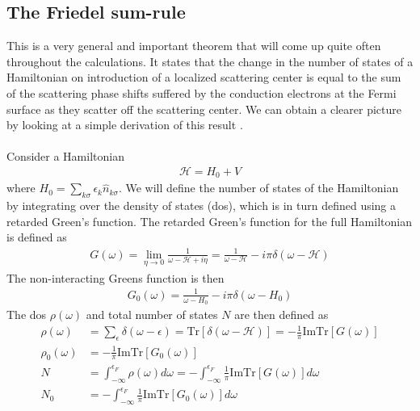 \documentclass[twoside]{report}
\numberwithin{equation}{section}
\begin{document}
\subsection{The Friedel sum-rule}
This is a very general and important theorem that will come up  quite often throughout the calculations. It states that the change in the number of states of a Hamiltonian on introduction of a localized scattering center is equal to the sum of the scattering phase shifts suffered by the conduction electrons at the Fermi surface as they scatter off the scattering center. We can obtain a clearer picture by looking at a simple derivation of this result \cite{hewson}.
\\\\Consider a Hamiltonian
\begin{equation}\begin{aligned}
	\mathcal{H} = H_0 + V
\end{aligned}\end{equation}
where \(H_0 = \sum_{k\sigma}\epsilon_k \hat n_{k\sigma}\). We will define the number of states of the Hamiltonian by integrating over the density of states (dos), which is in turn defined using a retarded Green's function. The retarded Green's function for the full Hamiltonian is defined as
\begin{equation}\begin{aligned}
	G(\omega) = \lim_{\eta \to 0}\frac{1}{\omega - \mathcal{H} + i\eta} = \frac{1}{\omega - \mathcal{H}} - i\pi\delta\left(\omega - \mathcal{H}\right)
\end{aligned}\end{equation}
The non-interacting Greens function is then
\begin{equation}\begin{aligned}
	G_0(\omega) = \frac{1}{\omega - H_0} - i\pi\delta\left(\omega - H_0\right)
\end{aligned}\end{equation}
The dos \(\rho(\omega)\) and total number of states \(N\) are then defined as
\begin{equation}\begin{aligned}
	\rho(\omega) &= \sum_\epsilon \delta(\omega - \epsilon) = \text{Tr}\left[ \delta(\omega - \mathcal{H}) \right] = - \frac{1}{\pi}\text{Im} \text{Tr}\left[ G(\omega) \right]\\
	\rho_0(\omega) &=  -\frac{1}{\pi}\text{Im} \text{Tr}\left[ G_0(\omega) \right]\\
	N &= \int_{-\infty}^{\epsilon_F} \rho(\omega) d\omega = - \int_{-\infty}^{\epsilon_F} \frac{1}{\pi}\text{Im} \text{Tr}\left[ G(\omega) \right]d\omega\\
	N_0 &= - \int_{-\infty}^{\epsilon_F} \frac{1}{\pi}\text{Im} \text{Tr}\left[ G_0(\omega) \right]d\omega
\end{aligned}\end{equation}
\end{document}

